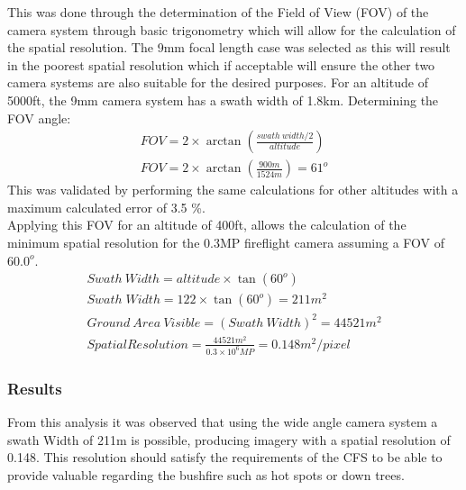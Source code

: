 This was done through the determination of the Field of View (FOV) of the camera system through basic trigonometry which will allow for the calculation of the spatial resolution. The 9mm focal length case was selected as this will result in the poorest spatial resolution which if acceptable will ensure the other two camera systems are also suitable for the desired purposes.
For an altitude of 5000ft, the 9mm camera system has a swath width of 1.8km. Determining the FOV angle: 
\begin{gather}
    \label{eq: FOV calculation}
    FOV = 2\times \arctan (\frac{swath\: width/2}{altitude} )\\
    FOV = 2\times \arctan ({\frac{900m}{1524m}}) = 61^o
\end{gather}
This was validated by performing the same calculations for other altitudes with a maximum calculated error of 3.5 \%. \\
Applying this FOV for an altitude of 400ft, allows the calculation of the minimum spatial resolution for the 0.3MP fireflight camera assuming a FOV of $60.0^o$.\\

\begin{gather}
    \label{eq: Swath calculation}
    Swath\: Width = altitude\times \tan(60^o)\\
    Swath\; Width = 122\times \tan(60^o) = 211m^2 \\
    Ground\: Area\: Visible = (Swath\: Width)^2 = 44521m^2 \\
    Spatial Resolution = \frac{44521m^2}{0.3\times10^6 MP} = 0.148m^2/pixel 
\end{gather}

\subsubsection{Results}
From this analysis it was observed that using the wide angle camera system a swath Width of 211m is possible, producing imagery with a spatial resolution of 0.148. This resolution should satisfy the requirements of the CFS to be able to provide valuable regarding the bushfire such as hot spots or down trees. 
